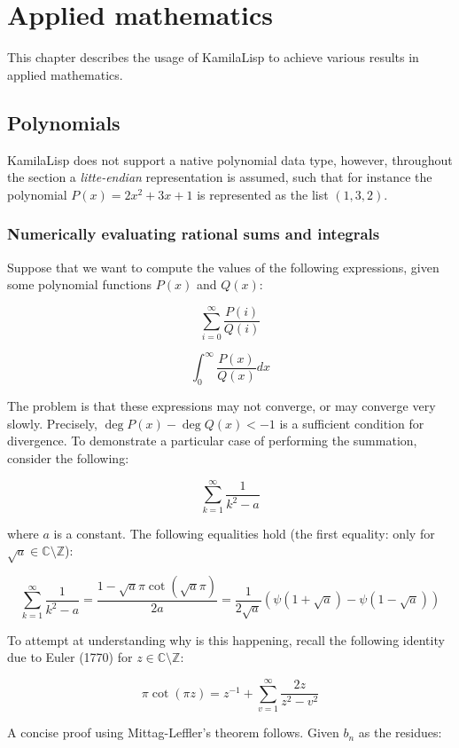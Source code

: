 
\chapter{Applied mathematics}

This chapter describes the usage of KamilaLisp to achieve various results in applied mathematics.

\section{Polynomials}

KamilaLisp does not support a native polynomial data type, however, throughout the section a \textit{litte-endian} representation is assumed, such that for instance the polynomial $P(x) = 2x^2 + 3x + 1$ is represented as the list $(1, 3, 2)$.

\subsection{Numerically evaluating rational sums and integrals}

Suppose that we want to compute the values of the following expressions, given some polynomial functions $P(x)$ and $Q(x)$:

$$
\sum_{i=0}^\infty \frac{P(i)}{Q(i)}
$$

$$
\int_0^\infty \frac{P(x)}{Q(x)} dx
$$

\noindent The problem is that these expressions may not converge, or may converge very slowly. Precisely, $\deg P(x) - \deg Q(x) < -1$ is a sufficient condition for divergence. To demonstrate a particular case of performing the summation, consider the following:

$$\sum_{k=1}^\infty \frac{1}{k^2 - a}$$

\noindent where $a$ is a constant. The following equalities hold (the first equality: only for $\sqrt{a} \in \mathbb{C} \setminus \mathbb{Z}$):

$$\sum_{k=1}^\infty \frac{1}{k^2 - a} = \frac{1-\sqrt{a}\pi\cot(\sqrt{a}\pi)}{2a} = \frac{1}{2\sqrt{a}}\left(\psi\left(1+\sqrt{a}\right)-\psi\left(1-\sqrt{a}\right)\right)$$

\noindent To attempt at understanding why is this happening, recall the following identity due to Euler (1770) for $z \in \mathbb{C} \setminus \mathbb{Z}$:

$$
\pi \cot(\pi z) = z^{-1} + \sum_{v=1}^\infty \frac{2z}{z^2 - v^2}
$$

\noindent A concise proof using Mittag-Leffler's theorem follows. Given $b_n$ as the residues:

